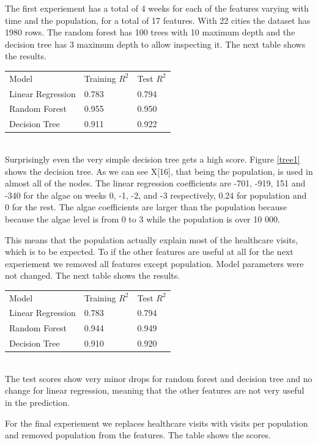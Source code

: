 \documentclass[a4paper, 12pt, english]{article}
\begin{document}
The first experiement has a total of 4 weeks for
each of the features varying with time and the
population, for a total of
17 features. With 22 cities the dataset has 1980 rows.
The random forest has 100 trees with 10 maximum depth
and the decision tree has 3 maximum depth to allow
inspecting it. The next table shows the results.\\

\begin{tabular}{l l l}
Model & Training \(R^2\) & Test \(R^2\) \\
Linear Regression & 0.783 & 0.794 \\
Random Forest & 0.955 & 0.950 \\
Decision Tree & 0.911 & 0.922 \\
\end{tabular}
\\

Surprisingly even the very simple decision tree
gets a high score.
Figure \ref{tree1} shows the decision tree. As we can see
X[16], that being the population, is used in almost
all of the nodes. The linear regression coefficients
are -701, -919,  151 and -340 for the algae on weeks
0, -1, -2, and -3 respectively, 0.24 for population
and 0 for the rest. The algae coefficients are larger
than the population because because the algae level is from 0 to 3
while the population is over 10 000.

This means that the population actually
explain most of the healthcare visits, which is
to be expected. To if the other features are useful at all
for the next experiement we removed all features
except population. Model parameters were not changed.
The next table shows the results.\\

\begin{tabular}{l l l}
Model & Training \(R^2\) & Test \(R^2\) \\
Linear Regression & 0.783 & 0.794 \\
Random Forest & 0.944 & 0.949 \\
Decision Tree & 0.910 & 0.920 \\
\end{tabular}
\\

The test scores show very minor drops for random forest
and decision tree and no change for linear regression,
meaning that the other features are not very useful
in the prediction.

For the final experiement we replaces healthcare
visits with visits per population and
removed population from the features.
The table shows the scores.\\
\end{document}
